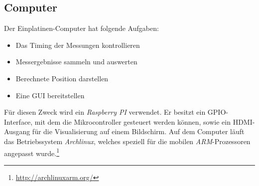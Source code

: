 \subsection{Computer}
Der Einplatinen-Computer hat folgende Aufgaben:
\begin{itemize}
	\item Das Timing der Messungen kontrollieren
	\item Messergebnisse sammeln und auswerten
	\item Berechnete Position darstellen
	\item Eine \ac{GUI} bereitstellen %
\end{itemize}
Für diesen Zweck wird ein \textit{Raspberry PI} verwendet. Er besitzt ein \ac{GPIO}-Interface, mit dem die Mikrocontroller gesteuert werden können, sowie ein \ac{HDMI}-Ausgang für die Visualisierung auf einem Bildschirm. Auf dem Computer läuft das Betriebssystem \textit{Archlinux}, welches speziell für die mobilen \textit{ARM}-Prozessoren angepasst wurde.\footnote{\url{http://archlinuxarm.org/}}



